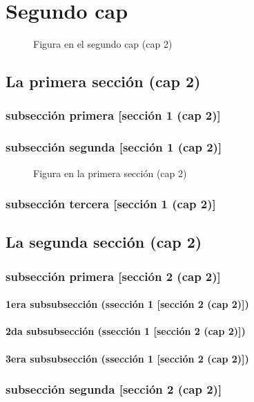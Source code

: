 \documentclass[12pt,a4paper]{report}
\begin{document}
\chapter{Segundo cap}
\begin{figure}[H]
\caption{Figura en el segundo cap (cap 2)}
\end{figure}
\section{La primera sección (cap 2)}
\subsection{subsección primera [sección 1 (cap 2)]}
\subsection{subsección segunda [sección 1 (cap 2)]}
\begin{figure}[H]
\caption{Figura en la primera sección (cap 2)}
\end{figure}
\subsection{subsección tercera [sección 1 (cap 2)]}
\section{La segunda sección (cap 2)}
\subsection{subsección primera [sección 2 (cap 2)]}
\subsubsection{1era subsubsección (ssección 1 [sección 2 (cap 2)])}
\subsubsection{2da subsubsección (ssección 1 [sección 2 (cap 2)])}
\subsubsection{3era subsubsección (ssección 1 [sección 2 (cap 2)])}
\subsection{subsección segunda [sección 2 (cap 2)]}
\end{document}
